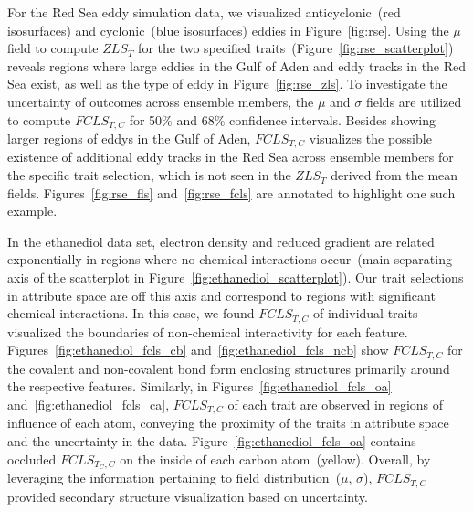 For the Red Sea eddy simulation data, we visualized anticyclonic~(red isosurfaces) and cyclonic~(blue isosurfaces) eddies in Figure~\ref{fig:rse}. 
%
Using the $\mu$ field to compute $ZLS_{T}$ for the two specified traits~(Figure~\ref{fig:rse_scatterplot}) reveals regions where large eddies in the Gulf of Aden and eddy tracks in the Red Sea exist, as well as the type of eddy in Figure~\ref{fig:rse_zls}.
%
To investigate the uncertainty of outcomes across ensemble members, the $\mu$ and $\sigma$ fields are utilized to compute $FCLS_{T,C}$ for 50\% and 68\% confidence intervals.
%
Besides showing larger regions of eddys in the Gulf of Aden, $FCLS_{T,C}$ visualizes the possible existence of additional eddy tracks in the Red Sea across ensemble members for the specific trait selection, which is not seen in the $ZLS_{T}$ derived from the mean fields.
%
Figures~\ref{fig:rse_fls} and~\ref{fig:rse_fcls} are annotated to highlight one such example.
%

%
In the ethanediol data set, electron density and reduced gradient are related exponentially in regions where no chemical interactions occur~(main separating axis of the scatterplot in Figure~\ref{fig:ethanediol_scatterplot}).
%
%
Our trait selections in attribute space are off this axis and correspond to regions with significant chemical interactions.
%
%
In this case, we found $FCLS_{T,C}$ of individual traits visualized the boundaries of non-chemical interactivity for each feature. 
%
Figures~\ref{fig:ethanediol_fcls_cb} and~\ref{fig:ethanediol_fcls_ncb} show $FCLS_{T,C}$ for the covalent and non-covalent bond form enclosing structures primarily around the respective features.
%
Similarly, in Figures~\ref{fig:ethanediol_fcls_oa} and~\ref{fig:ethanediol_fcls_ca}, $FCLS_{T,C}$ of each trait are observed in regions of influence of each atom, conveying the proximity of the traits in attribute space and the uncertainty in the data.
%
Figure~\ref{fig:ethanediol_fcls_oa} contains occluded $FCLS_{T_{C},C}$ on the inside of each carbon atom~(yellow). 
%
Overall, by leveraging the information pertaining to field distribution~(${\mu}$, ${\sigma}$), $FCLS_{T,C}$ provided secondary structure visualization based on uncertainty.
%
%


